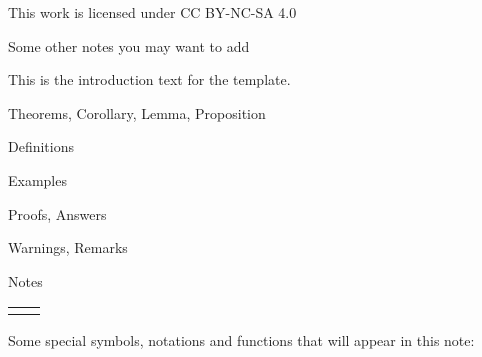 \documentclass{article}
\begin{document}
\maketitle

\begin{center}
    This work is licensed under CC BY-NC-SA 4.0
    
    Some other notes you may want to add
\end{center}


\newpage

    This is the introduction text for the template.

    \bigskip


\begin{thmbox}
    Theorems, Corollary, Lemma, Proposition
\end{thmbox}

\begin{defbox}
    Definitions
\end{defbox}

\begin{expbox}
    Examples
\end{expbox}

\begin{prfbox}
    Proofs, Answers
\end{prfbox}

\begin{warnbox}
    Warnings, Remarks
\end{warnbox}

\begin{notebox}
    Notes
\end{notebox}

\begin{tabular}{ll}
    &\\
\end{tabular}

Some special symbols, notations and functions that will appear in this note:\bigskip
\end{document}

